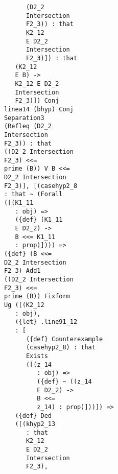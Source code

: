 \documentclass[12pt]{article}
\begin{document}
\begin{verbatim}
                                     (D2_2 
                                     Intersection 
                                     F2_3)) : that 
                                     K2_12 
                                     E D2_2 
                                     Intersection 
                                     F2_3)]) : that 
                                  (K2_12 
                                  E B) -> 
                                  K2_12 E D2_2 
                                  Intersection 
                                  F2_3)]) Conj 
                               linea14 (bhyp) Conj 
                               Separation3 
                               (Refleq (D2_2 
                               Intersection 
                               F2_3)) : that 
                               ((D2_2 Intersection 
                               F2_3) <<= 
                               prime (B)) V B <<= 
                               D2_2 Intersection 
                               F2_3)], [(casehyp2_8 
                               : that ~ (Forall 
                               ([(K1_11 
                                  : obj) => 
                                  ({def} (K1_11 
                                  E D2_2) -> 
                                  B <<= K1_11 
                                  : prop)]))) => 
                               ({def} (B <<= 
                               D2_2 Intersection 
                               F2_3) Add1 
                               ((D2_2 Intersection 
                               F2_3) <<= 
                               prime (B)) Fixform 
                               Ug ([(K2_12 
                                  : obj), 
                                  ({let} .line91_12 
                                  : [
                                     ({def} Counterexample 
                                     (casehyp2_8) : that 
                                     Exists 
                                     ([(z_14 
                                        : obj) => 
                                        ({def} ~ ((z_14 
                                        E D2_2) -> 
                                        B <<= 
                                        z_14) : prop)]))]) => 
                                  ({def} Ded 
                                  ([(khyp2_13 
                                     : that 
                                     K2_12 
                                     E D2_2 
                                     Intersection 
                                     F2_3), 

\end{verbatim}
\end{document}
